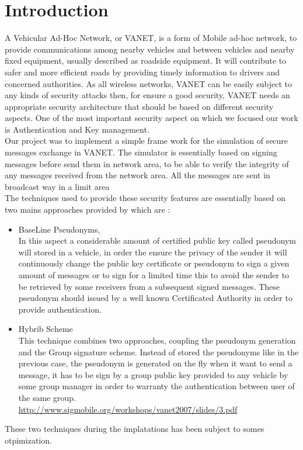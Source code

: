 \section{Introduction}
A Vehicular Ad-Hoc Network, or VANET, is a form of Mobile ad-hoc network, to provide communications among nearby vehicles and between vehicles and nearby fixed equipment, usually described as roadside equipment. It will contribute to safer and more efficient roads by providing timely information to drivers and concerned authorities.
As all wireless networks, VANET can be easily subject to any kinds of security  attacks then, for ensure a good security, VANET needs an appropriate security architecture that should be based on different security aspects. One of the most important security aspect on which we focused our work is Authentication and Key management.\\
Our project was to implement a simple frame work for the simulation of secure messages exchange in VANET. The simulator is essentially based on  signing  messages before send them in network area, to be able to verify the integrity of any messages received from the network area. All the messages are sent in broadcast way in a limit area\\
The techniques used to provide these security features are essentially based on two mains approaches provided
 by\cite{calandriello} which are :
\begin{itemize}
\item BaseLine Pseudonyms,\\
In this aspect a considerable amount of certified public key called pseudonym  will stored in a vehicle, in order the ensure the privacy of the sender it will continuously change the public key certificate or pseudonym to sign a given amount of messages or to sign for a limited time this to avoid the sender to be retrieved by some receivers from a subsequent signed messages. These pseudonym should issued by a well known Certificated Authority in order to provide authentication.

\item Hybrib Scheme\\
This technique combines two approaches, coupling the pseudonym generation and the Group signature scheme.
Instead of stored the pseudonyms like in the previous case, the pseudonym  is generated on the fly when it want to send a message, it has to be sign by a group public key provided to any vehicle by some group manager in order to warranty the authentication between user of the same group.
\\
\url{http://www.sigmobile.org/workshops/vanet2007/slides/3.pdf}
\end{itemize}
These two techniques during the implatations has been subject to somes otpimization.
\\
\\